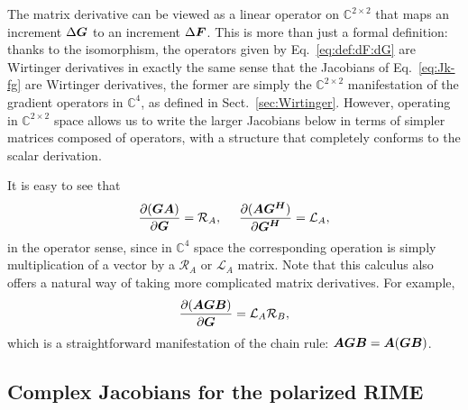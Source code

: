 \documentclass[useAMS,usenatbib]{mn2e}
\newcommand{\COMPLEX}{\mathbb{C}}
\newcommand{\mat}[1]{{\bmath{#1}}}
\newcommand{\Rop}[1]{\mathcal{R}_{{#1}}}
\newcommand{\Lop}[1]{\mathcal{L}_{{#1}}}
\numberwithin{equation}{section} %
\providecommand{\DIFaddend}{} %
\begin{document}
{The matrix derivative can be viewed as a linear operator on $\COMPLEX^{2\times2}$ that maps an increment
$\Delta\mat{G}$ 
to an increment $\Delta\mat{F}$. This is more than just a formal definition: thanks to the isomorphism, the operators 
given by Eq.~\ref{eq:def:dF:dG}  are Wirtinger derivatives in exactly the same sense that the Jacobians of 
Eq.~\ref{eq:Jk-fg} are Wirtinger derivatives, the former are simply the $\COMPLEX^{2\times2}$ manifestation of
the gradient operators in $\COMPLEX^4$, as defined in Sect.~\ref{sec:Wirtinger}. However, operating in 
$\COMPLEX^{2\times2}$ space allows us to write the larger Jacobians below in terms of simpler matrices composed 
of operators, with a structure that completely conforms to the scalar derivation.

It is easy to see that
\begin{equation}
\frac{\partial(\mat{GA})}{\partial{\mat{G}}} = \Rop{A},~~~~\frac{\partial(\mat{AG^H})}{\partial{\mat{G^H}}} = \Lop{A},
\end{equation}
in the operator sense, since in $\COMPLEX^4$ space the corresponding operation is simply multiplication of 
a vector by a $\Rop{A}$ or $\Lop{A}$ matrix. Note that this calculus also offers a natural way of taking more
complicated matrix derivatives. For example,
\begin{equation}
\frac{\partial(\mat{AGB})}{\partial{\mat{G}}} = \Lop{A}\Rop{B},
\end{equation}
which is a straightforward manifestation of the chain rule: $\mat{AGB}=\mat{A}(\mat{GB})$.
}
\DIFaddend

\subsection{Complex Jacobians for the polarized RIME}
\end{document}
